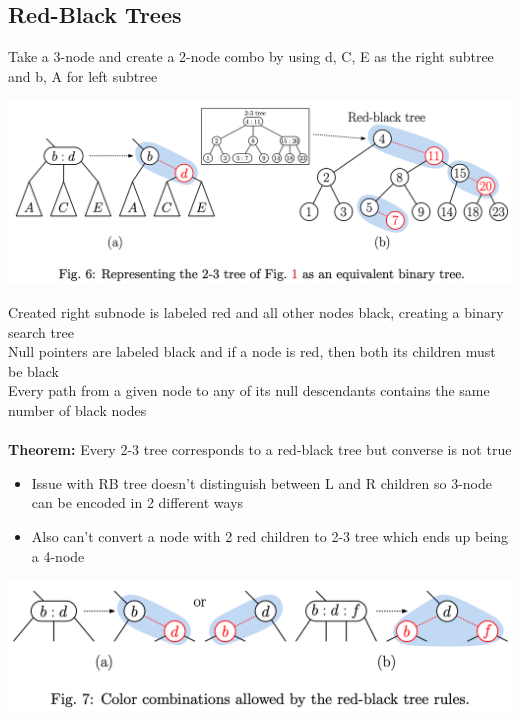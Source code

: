 \documentclass{article}
\begin{document}
  \subsection{Red-Black Trees}
  Take a 3-node and create a 2-node combo by using d, C, E as the right subtree and b, A for left subtree
  \begin{center}
  \includegraphics[scale=0.2]{RBTree}
  \end{center}
  Created right subnode is labeled red and all other nodes black, creating a binary search tree\\
  Null pointers are labeled black and if a node is red, then both its children must be black \\
  Every path from a given node to any of its null descendants contains the same number of black nodes\\ \\
  \textbf{Theorem: }Every 2-3 tree corresponds to a red-black tree but converse is not true
  \begin{itemize}[noitemsep]
  \item Issue with RB tree doesn't distinguish between L and R children so 3-node can be encoded in 2 different ways
  \item Also can't convert a node with 2 red children to 2-3 tree which ends up being a 4-node
  \end{itemize}
  \begin{center}
  \includegraphics[scale=0.15]{2-3ToRBTree}
  \end{center}
\end{document}
